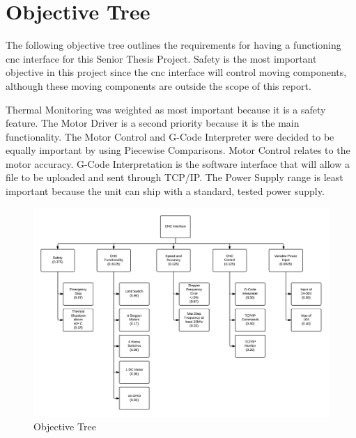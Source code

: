 \section{Objective Tree}
The following objective tree outlines the requirements for having a functioning \gls{cnc} interface for this Senior Thesis Project.
Safety is the most important objective in this project since the \gls{cnc} interface will control moving components, although these moving components are outside the scope of this report.

Thermal Monitoring was weighted as most important because it is a safety feature.
The Motor Driver is a second priority because it is the main functionality.
The Motor Control and G-Code Interpreter were decided to be equally important by using Piecewise Comparisons.
Motor Control relates to the motor accuracy.
G-Code Interpretation is the software interface that will allow a file to be uploaded and sent through TCP/IP.
The Power Supply range is least important because the unit can ship with a standard, tested power supply.

\begin{figure}[H]
\centering
\includegraphics[width=1.0\textwidth]{otree.png}
\caption{Objective Tree}
\label{fig:o-tree}
\end{figure} 

